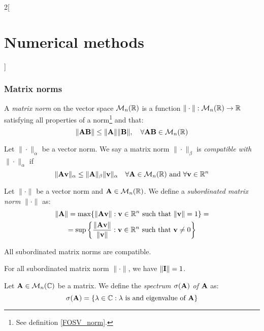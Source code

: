 \documentclass[../../../main.tex]{subfiles}
\begin{document}
\begin{multicols}{2}[\section{Numerical methods}]
    \subsubsection*{Matrix norms}
    \begin{definition}
        A \textit{matrix norm} on the vector space $\mathcal{M}_n(\mathbb{R})$ is a function $\|\cdot\|:\mathcal{M}_n(\mathbb{R})\rightarrow\mathbb{R}$ satisfying all properties of a norm\footnote{See definition \ref{FOSV_norm}.} and that: $$\|\boldsymbol{\mathrm{A}}\boldsymbol{\mathrm{B}}\|\leq\|\boldsymbol{\mathrm{A}}\|\|\boldsymbol{\mathrm{B}}\|,\quad\forall \boldsymbol{\mathrm{A}}\boldsymbol{\mathrm{B}}\in\mathcal{M}_n(\mathbb{R})$$
    \end{definition}
    \begin{definition}
        Let $\|\cdot\|_\alpha$ be a vector norm. We say a matrix norm $\|\cdot\|_\beta$ is \textit{compatible with $\|\cdot\|_\alpha$} if $$\|\boldsymbol{\mathrm{A}}\boldsymbol{\mathrm{v}}\|_\alpha\leq\|\boldsymbol{\mathrm{A}}\|_\beta\|\boldsymbol{\mathrm{v}}\|_\alpha\quad\forall\boldsymbol{\mathrm{A}}\in\mathcal{M}_n(\mathbb{R})\text{ and }\forall\boldsymbol{\mathrm{v}}\in\mathbb{R}^n$$
    \end{definition}
    \begin{definition}
        Let $\|\cdot\|$ be a vector norm and $\boldsymbol{\mathrm{A}}\in\mathcal{M}_n(\mathbb{R})$. We define a \textit{subordinated matrix norm} $\|\cdot\|$ as:
        \begin{multline*}
            \|\boldsymbol{\mathrm{A}}\|=\max\{\|\boldsymbol{\mathrm{A}}\boldsymbol{\mathrm{v}}\|:\boldsymbol{\mathrm{v}}\in\mathbb{R}^n\text{ such that }\|\boldsymbol{\mathrm{v}}\|=1\}=\\=\sup\left\{\frac{\|\boldsymbol{\mathrm{A}}\boldsymbol{\mathrm{v}}\|}{\|\boldsymbol{\mathrm{v}}\|}:\boldsymbol{\mathrm{v}}\in\mathbb{R}^n\text{ such that }\boldsymbol{\mathrm{v}}\ne 0\right\}
        \end{multline*}
    \end{definition}
    \begin{lemma}
        All subordinated matrix norms are compatible.
    \end{lemma}
    \begin{lemma}
        For all subordinated matrix norm $\|\cdot\|$, we have $\|\boldsymbol{\mathrm{I}}\|=1$.
    \end{lemma}
    \begin{definition}
        Let $\boldsymbol{\mathrm{A}}\in\mathcal{M}_n(\mathbb{C})$ be a matrix. We define the \textit{spectrum $\sigma(\boldsymbol{\mathrm{A}})$ of $\boldsymbol{\mathrm{A}}$} as: $$\sigma(\boldsymbol{\mathrm{A}})=\{\lambda\in\mathbb{C}:\lambda\text{ is and eigenvalue of }\boldsymbol{\mathrm{A}}\}$$

\end{definition}
\end{multicols}
\end{document}
